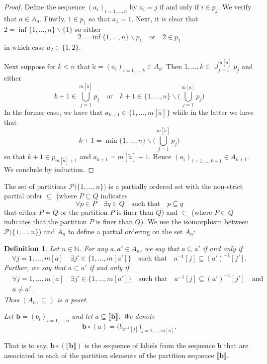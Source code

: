 \documentclass[a4paper,11pt,twoside]{article}
\numberwithin{equation}{section}
\theoremstyle{plain}
\newtheorem{definition}[theorem]{Definition}
\newcommand{\bN}{\mathbb{N}}
\newcommand{\scP}{\mathscr{P}}
\newcommand{\1}{\mathbbm{1}}
\begin{document}
\begin{proof}
		Define the sequence $(a_i)_{i=1, ..., n}$ by $a_i = j$ if and only if $i \in p_j$. We verify that $a \in A_n$. Firstly, $1\in p_1$ so that $a_1 =1$. Next, it is clear that $2 = \inf\{1, ..., n\}\backslash\{1\}$ so either
		$$
		2 =  \inf\{1, ..., n\}\backslash p_1 \quad\mbox{or}\quad 2\in p_1
		$$
		in which case $a_2 \in \{1, 2\}$. 
		
		Next suppose for $k <n$ that $\tilde{a} = (a_i)_{i=1, ..., k} \in A_{k}$. Then $1, ..., k \in \cup_{j=1}^{m[\tilde{a}]} p_{j}$ and either
		$$
		k+1 \in \bigcup_{j=1}^{m[\tilde{a}]} p_j \quad \mbox{or} \quad k+1 \in \big\{ 1, ..., n \big\} \backslash \Big( \bigcup_{j=1}^{m[a]} p_j \Big)
		$$
		In the former case, we have that $a_{k+1} \in \{1, ..., m[\tilde{a}] \}$ while in the latter we have that
		$$
		k+1 = \min \big\{ 1, ..., n\big\} \backslash \Big( \bigcup_{j=1}^{m[\tilde{a}]} p_j \Big)
		$$
		so that $k+1 \in p_{m[\tilde{a}]+1}$ and $a_{k+1} = m[\tilde{a}]+1$. Hence $(a_i)_{i=1, ..., k+1} \in A_{k+1}$. We conclude by induction. 
	\end{proof}

	The set of partitions $\scP\big( \{1, ..., n\}\big)$ is a partially ordered set with the non-strict partial order $\subseteq$ (where $P \subseteq Q$ indicates 
	\begin{equation*}
		\forall p \in P \quad \exists q \in Q \quad \mbox{such that} \quad p \subseteq q
	\end{equation*}
	that either $P=Q$ or the partition $P$ is finer than $Q$) and $\subset$ (where $P\subset Q$ indicates that the partition $P$ is finer than $Q$). We use the isomorphism between $\scP\big(\{1, ..., n\}\big)$ and $A_n$ to define a partial ordering on the set $A_n$:
	\begin{definition}
		Let $n\in \bN$. For any $a, a'\in A_n$, we say that $a\subseteq a'$ if and only if
		\begin{equation*}
			\forall j=1, ..., m[a] \quad \exists j' \in \{1, ..., m[a']\} \quad \mbox{such that} \quad a^{-1}[j] \subseteq (a')^{-1}[j']. 
		\end{equation*}
		Further, we say that $a\subset a'$ if and only if
		\begin{align*}
			&\forall j=1, ..., m[a] \quad \exists j' \in \{1, ..., m[a']\} \quad \mbox{such that} \quad a^{-1}[j] \subseteq (a')^{-1}[j'] \quad \mbox{and}
			\\
			& a\neq a'. 
		\end{align*}
		Thus $(A_n, \subseteq)$ is a poset. 
		
		Let $\boldsymbol{b}=(b_i)_{i=1, ..., n}$ and let $a \subseteq \llbracket \boldsymbol{b} \rrbracket$. We denote
		\begin{equation}
			\label{eq:K-sequence'}
			\boldsymbol{b}\circ(a) = \Big( b_{a^{-1}[j]} \Big)_{j=1, ..., m[a]}. 
		\end{equation}
	\end{definition}
	That is to say, $\boldsymbol{b}\circ (\llbracket \boldsymbol{b} \rrbracket)$ is the sequence of labels from the sequence $\boldsymbol{b}$ that are associated to each of the partition elements of the partition sequence $\llbracket \boldsymbol{b} \rrbracket$. 
	
\end{document}
